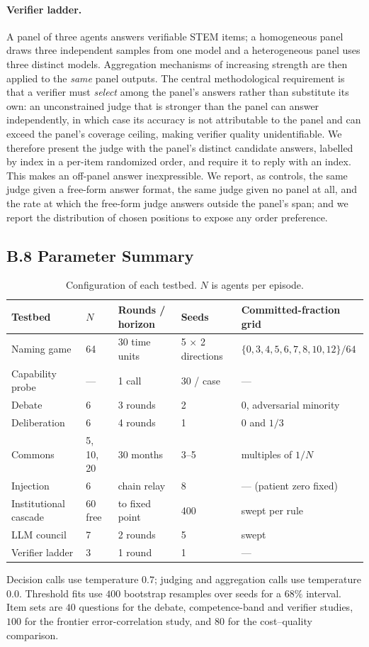 \documentclass[manuscript,screen,review]{acmart}
\begin{document}
\paragraph{Verifier ladder.} A panel of three agents answers verifiable STEM
items; a homogeneous panel draws three independent samples from one model and a
heterogeneous panel uses three distinct models. Aggregation mechanisms of
increasing strength are then applied to the \emph{same} panel outputs. The
central methodological requirement is that a verifier must \emph{select} among
the panel's answers rather than substitute its own: an unconstrained judge that
is stronger than the panel can answer independently, in which case its accuracy
is not attributable to the panel and can exceed the panel's coverage ceiling,
making verifier quality unidentifiable. We therefore present the judge with the
panel's distinct candidate answers, labelled by index in a per-item randomized
order, and require it to reply with an index. This makes an off-panel answer
inexpressible. We report, as controls, the same judge given a free-form answer
format, the same judge given no panel at all, and the rate at which the free-form
judge answers outside the panel's span; and we report the distribution of chosen
positions to expose any order preference.

\subsection*{B.8 Parameter Summary}
\begin{table}[h]
\small
\caption{Configuration of each testbed. $N$ is agents per episode.}
\label{tab:params}
\begin{tabular}{@{}p{2.5cm}p{1.1cm}p{1.6cm}p{1.3cm}p{4.6cm}@{}}
\toprule
\textbf{Testbed} & \textbf{$N$} & \textbf{Rounds / horizon} & \textbf{Seeds} & \textbf{Committed-fraction grid} \\
\midrule
Naming game & 64 & 30 time units & 5 $\times$ 2 directions & $\{0,3,4,5,6,7,8,10,12\}/64$ \\
Capability probe & --- & 1 call & 30 / case & --- \\
Debate & 6 & 3 rounds & 2 & $0$, adversarial minority \\
Deliberation & 6 & 4 rounds & 1 & $0$ and $1/3$ \\
Commons & 5, 10, 20 & 30 months & 3--5 & multiples of $1/N$ \\
Injection & 6 & chain relay & 8 & --- (patient zero fixed) \\
Institutional cascade & 60 free & to fixed point & 400 & swept per rule \\
LLM council & 7 & 2 rounds & 5 & swept \\
Verifier ladder & 3 & 1 round & 1 & --- \\
\bottomrule
\end{tabular}
\end{table}

\noindent Decision calls use temperature $0.7$; judging and aggregation calls use
temperature $0.0$. Threshold fits use $400$ bootstrap resamples over seeds for a
$68\%$ interval. Item sets are $40$ questions for the debate, competence-band and
verifier studies, $100$ for the frontier error-correlation study, and $80$ for the
cost--quality comparison.
\end{document}
